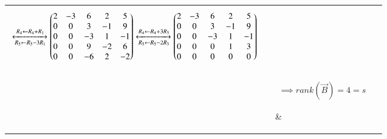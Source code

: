 \documentclass[journal,12pt]{IEEEtran}
\begin{document}
\begin{longtable}{|l|l|l|}
{\begin{align}
    &\xleftrightarrow[R_5\leftarrow R_5-3R_1]{R_4\leftarrow R_4+R_1}\begin{pmatrix}2&-3&6&2&5\\0&0&3&-1&9\\0&0&-3&1&-1\\0&0&9&-2&6\\0&0&-6&2&-2\end{pmatrix}\xleftrightarrow[R_5\leftarrow R_5-2R_3]{R_4\leftarrow R_4+3R_3}\begin{pmatrix}2&-3&6&2&5\\0&0&3&-1&9\\0&0&-3&1&-1\\0&0&0&1&3\\0&0&0&0&0\end{pmatrix}
\end{align}}&\\&\parbox{14cm}{\begin{align}
    \implies rank(\vec{B})=4=s\label{rb}
\end{align}}&\\&Now matrix $\vec{P}$ will be&\\&\parbox{14cm}{\begin{align}
    \vec{P}&=\vec{B}-\vec{A}\\
    \implies\vec{P}&=\myvec{0&0&0&0&0\\0&0&0&0&8\\0&0&0&0&0\\0&0&0&0&0\\0&0&0&0&0}\label{P}\\
    \implies rank(\vec{P})&=1
\end{align}}&\\&Now we will see equation \eqref{p1} is satisfied or not&\\&\parbox{14cm}{\begin{align}
    s\leq r+1\implies4\leq3+1\implies4\leq4
\end{align}}&\\&Hence satisfied&\\
.&From \eqref{APB}, If $\vec{P}=-\vec{Q}$ then we can get as below&\\&\parbox{14cm}{\begin{align}
    \vec{A}-\vec{Q}=\vec{B}\\
    \implies\vec{B}+\vec{Q}=\vec{A}\label{BQP}
\end{align}}&\\&Since matrix $\vec{Q}$ also consists only single element we can say that $rank(\vec{Q})=1$&True\\&From \eqref{prop}, \eqref{BQP}, we get&\\&\parbox{14cm}{\begin{align}
    rank(\vec{B}+\vec{Q})&\leq rank(\vec{B})+rank(\vec{Q})\\

\end{align}}
\end{longtable}
\end{document}
